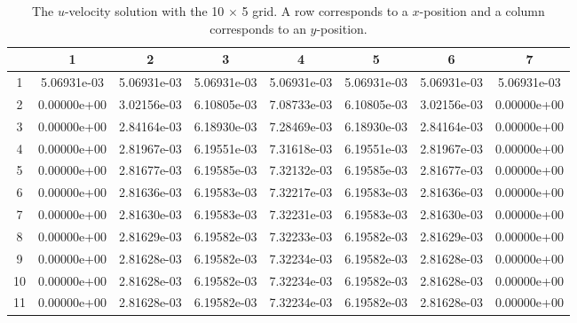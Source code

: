 \documentclass{article}
\begin{document}
\def\arraystretch{1.3}
\begin{table}[H]
	\scriptsize
	\centering
	\caption{The $u$-velocity solution with the 10 $\times$ 5 grid. A row corresponds to a $x$-position and a column corresponds to an $y$-position.}
	\vspace{0.2cm}
	\begin{tabular}{c|S|S|S|S|S|S|S}
		& {1} & {2} & {3} & {4} & {5} & {6} & {7} \\
		 & 5.06931e-03 & 5.06931e-03 & 5.06931e-03 & 5.06931e-03 & 5.06931e-03 & 5.06931e-03 & 5.06931e-03 \\
		2 & 0.00000e+00 & 3.02156e-03 & 6.10805e-03 & 7.08733e-03 & 6.10805e-03 & 3.02156e-03 & 0.00000e+00 \\
		3 & 0.00000e+00 & 2.84164e-03 & 6.18930e-03 & 7.28469e-03 & 6.18930e-03 & 2.84164e-03 & 0.00000e+00 \\
		4 & 0.00000e+00 & 2.81967e-03 & 6.19551e-03 & 7.31618e-03 & 6.19551e-03 & 2.81967e-03 & 0.00000e+00 \\
		5 & 0.00000e+00 & 2.81677e-03 & 6.19585e-03 & 7.32132e-03 & 6.19585e-03 & 2.81677e-03 & 0.00000e+00 \\
		6 & 0.00000e+00 & 2.81636e-03 & 6.19583e-03 & 7.32217e-03 & 6.19583e-03 & 2.81636e-03 & 0.00000e+00 \\
		7 & 0.00000e+00 & 2.81630e-03 & 6.19583e-03 & 7.32231e-03 & 6.19583e-03 & 2.81630e-03 & 0.00000e+00 \\
		8 & 0.00000e+00 & 2.81629e-03 & 6.19582e-03 & 7.32233e-03 & 6.19582e-03 & 2.81629e-03 & 0.00000e+00 \\
		9 & 0.00000e+00 & 2.81628e-03 & 6.19582e-03 & 7.32234e-03 & 6.19582e-03 & 2.81628e-03 & 0.00000e+00 \\
		10 & 0.00000e+00 & 2.81628e-03 & 6.19582e-03 & 7.32234e-03 & 6.19582e-03 & 2.81628e-03 & 0.00000e+00 \\
		11 & 0.00000e+00 & 2.81628e-03 & 6.19582e-03 & 7.32234e-03 & 6.19582e-03 & 2.81628e-03 & 0.00000e+00 \\
	\end{tabular}
	\label{table:coarse-u}
\end{table}
\end{document}
